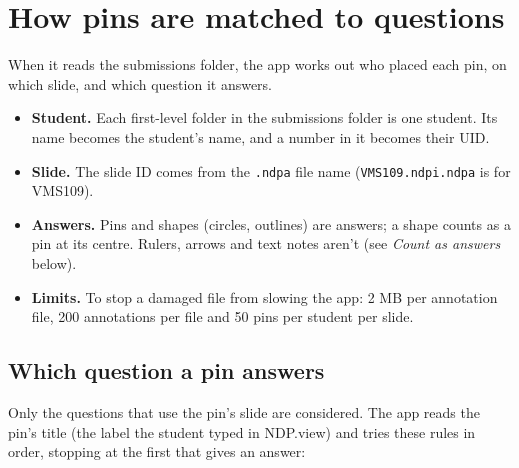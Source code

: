 \appendix
\section{How pins are matched to questions}\label{app:pins}\label{sec:getting-started:how-student-pins-are-read}

When it reads the submissions folder, the app works out who placed each pin, on which slide, and which question it answers.

\begin{itemize}[topsep=2pt, itemsep=2pt]
\item \textbf{Student.} Each first-level folder in the submissions folder is one student. Its name becomes the student's name, and a number in it becomes their UID.
\item \textbf{Slide.} The slide ID comes from the \texttt{.ndpa} file name (\texttt{VMS109.ndpi.ndpa} is for VMS109).
\item \textbf{Answers.} Pins and shapes (circles, outlines) are answers; a shape counts as a pin at its centre. Rulers, arrows and text notes aren't (see \emph{Count as answers} below).
\item \textbf{Limits.} To stop a damaged file from slowing the app: 2 MB per annotation file, 200 annotations per file and 50 pins per student per slide.
\end{itemize}

\subsection*{Which question a pin answers}

Only the questions that use the pin's slide are considered. The app reads the pin's title (the label the student typed in NDP.view) and tries these rules in order, stopping at the first that gives an answer:

